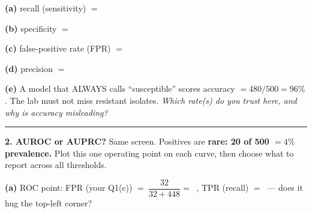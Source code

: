 \documentclass[11pt]{article}
\newif\ifsolution
\newcommand{\blk}[1]{\underline{\hspace{#1}}}
\newcommand{\rb}[2]{\ifsolution\textbf{#1}\else\blk{#2}\fi}
\newcommand{\keybox}[1]{\ifsolution\par\vspace{2pt}%
  \fbox{\parbox{0.965\textwidth}{\small\textbf{Answer.}\; #1}}\par\fi}
\newcommand{\work}[1]{\ifsolution\else\vspace{#1}\fi}
\begin{document}
\vspace{2pt}
\textbf{(a)} recall (sensitivity) $=$ \rb{$16/20 = 0.80$ \,(80\%)}{3.4cm}
\work{0.3cm}

\textbf{(b)} specificity $=$ \rb{$448/480 = 0.93$ \,(93\%)}{3.4cm}
\work{0.3cm}

\textbf{(c)} false-positive rate (FPR) $=$ \rb{$32/480 = 0.067$ \,(6.7\%)}{3.4cm}
\work{0.3cm}

\textbf{(d)} precision $=$ \rb{$16/48 = 0.33$ \,(33\%)}{3.4cm}
\work{0.3cm}

\textbf{(e)} A model that ALWAYS calls ``susceptible'' scores accuracy $= 480/500 = 96\%$. The lab must not miss
resistant isolates. \emph{Which rate(s) do you trust here, and why is accuracy misleading?}

\work{1.0cm}
\ifsolution\else\blk{\linewidth}\par\vspace{2pt}\blk{\linewidth}\fi

\keybox{(a) recall $= 16/(16+4) = 16/20 = \mathbf{0.80}$ (\textbf{80\%}). (b) specificity $= 448/(448+32) = 448/480 =
\mathbf{0.93}$ (\textbf{93\%}). (c) FPR $= FP/(FP+TN) = 32/(32+448) = 32/480 = \mathbf{0.067}$ (\textbf{6.7\%}) ---
the share of susceptibles wrongly flagged, and exactly $1 - \text{specificity} = 1 - 0.933$. (d) precision $= 16/(16+32) =
16/48 = \mathbf{0.33}$ (\textbf{33\%}). Accuracy $= (16+448)/500 = 464/500 = \mathbf{0.93}$ (93\%). (e) Trust \textbf{recall} (catch the resistant) reported \emph{with}
\textbf{precision} (only 1 flag in 3 is real). Positives are rare (20 of 500), so accuracy is dominated by the 480
susceptibles: an always-``susceptible'' model scores \textbf{96\%} yet catches \textbf{0 of 20} resistant. Accuracy
hides both the missed cases and the false alarms.}

\vspace{2pt}\hrule\vspace{5pt}

\textbf{2. AUROC or AUPRC?}\; {\small Same screen. Positives are \textbf{rare: 20 of 500 $= 4\%$ prevalence.} Plot
this one operating point on each curve, then choose what to report across all thresholds.}

\vspace{2pt}
\textbf{(a)} ROC point: FPR (your Q1(c)) $=\ \dfrac{32}{32+448} =\ $ \rb{$32/480 = 0.067$}{2.8cm}, \; TPR (recall) $=\ $
\rb{$0.80$}{2.0cm}\; --- does it hug the top-left corner? \rb{yes (looks great)}{3.0cm}
\work{0.3cm}
\end{document}
